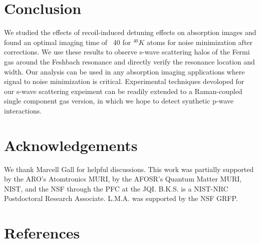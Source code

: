 \documentclass[12pt]{iopart}
\begin{document}
\section{Conclusion}
We studied the effects of recoil-induced detuning effects on absorption images and found an optimal imaging time of ~40\us{} for $^{40}K$ atoms for noise minimization after corrections. We use these results to observe s-wave scattering halos of the Fermi gas around the Feshbach resonance and directly verify the resonance location and width. Our analysis can be used in any absorption imaging applications where signal to noise minimization is critical. Experimental techniques devoloped for our s-wave scattering expeiment can be readily extended to a Raman-coupled single component gas version, in which we hope to detect synthetic p-wave interactions. 
\section*{Acknowledgements}
We thank Marcell Gall for helpful discussions. This work was partially supported by the ARO’s Atomtronics MURI, by the
AFOSR’s Quantum Matter MURI, NIST, and the NSF through the PFC at the JQI. B.K.S. is
a NIST-NRC Postdoctoral Research Associate. L.M.A. was supported by the NSF GRFP.

\section*{References}
{}

\end{document}
